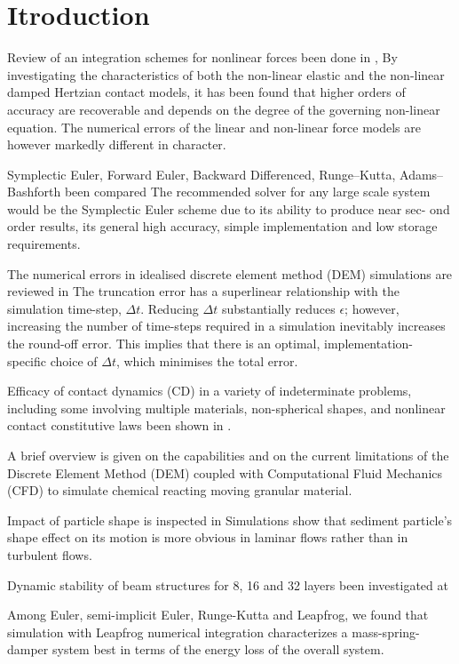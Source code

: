 
\section*{Itroduction}
Review of an integration schemes for nonlinear forces been done in
\cite{Danby2013}, By investigating the characteristics of both the non-linear
elastic and the non-linear damped Hertzian contact models, it has been found
that higher orders of accuracy are recoverable and depends on the degree of the
governing non-linear equation. The numerical errors of the linear and non-linear
force models are however markedly different in character.

Symplectic Euler, Forward Euler, Backward Differenced, Runge–Kutta,
Adams–Bashforth been compared \cite{IACOBELLIS2019111373} The recommended solver
for any large scale system would be the Symplectic Euler scheme due to its
ability to produce near sec- ond order results, its general high accuracy,
simple implementation and low storage requirements.

The numerical errors in idealised discrete element method (DEM) simulations are
reviewed in \cite{Hanley2017} The truncation error has a superlinear
relationship with the simulation time-step, $\Delta t$. Reducing $\Delta t$
substantially reduces $\epsilon $; however, increasing the number of time-steps
required in a simulation inevitably increases the round-off error. This implies
that there is an optimal, implementation- specific choice of $\Delta t$, which
minimises the total error.

Efficacy of contact dynamics (CD) in a variety of indeterminate problems, including
some involving multiple materials, non-spherical shapes, and nonlinear contact
constitutive laws been shown in \cite{Olsen2018a}.

A brief overview is given on the capabilities and on the current limitations of
the Discrete Element Method (DEM) coupled with Computational Fluid Mechanics
(CFD) to simulate chemical reacting moving granular material.\cite{Scherer2017}

Impact of particle shape is inspected in \cite{Zhang2020} Simulations show that
sediment particle’s shape effect on its motion is more obvious in laminar flows
rather than in turbulent flows.

Dynamic stability of beam structures for 8, 16 and 32 layers been investigated
at \cite{Smoljanovic2020} 

Among Euler, semi-implicit Euler, Runge-Kutta and Leapfrog, we found that                                                                                                   
simulation with Leapfrog numerical integration characterizes a mass-spring-damper
system best in terms of the energy loss of the overall system. \cite{Ozguz2011}                                                                                      